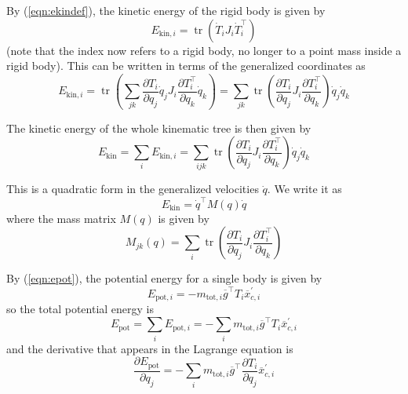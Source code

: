 \documentclass[a4paper]{article}
\begin{document}
By (\ref{eqn:ekindef}), the kinetic energy of the rigid body is given by
\begin{equation}
E_{\mathrm{kin},i} = \operatorname{tr} (\dot{T}_i J_i \dot{T}_i^\top)
\end{equation}
(note that the index now refers to a rigid body, no longer to a point mass inside a rigid body). This can be written in terms of the generalized coordinates as
\begin{equation}
E_{\mathrm{kin},i} = \operatorname{tr} (\sum_{jk} \frac{\partial T_i}{\partial q_j} \dot{q}_j J_i \frac{\partial T_i^\top}{\partial q_k} \dot{q}_k)
= \sum_{jk} \operatorname{tr} (\frac{\partial T_i}{\partial q_j} J_i \frac{\partial T_i^\top}{\partial q_k}) \dot{q}_j \dot{q}_k
\end{equation}

The kinetic energy of the whole kinematic tree is then given by
\begin{equation}
E_\mathrm{kin} = \sum_i E_{\mathrm{kin},i} = \sum_{ijk} \operatorname{tr} (\frac{\partial T_i}{\partial q_j} J_i \frac{\partial T_i^\top}{\partial q_k}) \dot{q}_j \dot{q}_k
\end{equation}

This is a quadratic form in the generalized velocities $\dot{q}$. We write it as
\begin{equation}
E_\mathrm{kin} = \dot{q}^\top M(q) \dot{q}
\end{equation}
where the mass matrix $M(q)$ is given by
\begin{equation}
M_{jk}(q) = \sum_i \operatorname{tr} (\frac{\partial T_i}{\partial q_j} J_i \frac{\partial T_i^\top}{\partial q_k})
\end{equation}

By (\ref{eqn:epot}), the potential energy for a single body is given by
\begin{equation}
E_{\mathrm{pot},i} = - m_{\mathrm{tot},i} \overline{g}^\top T_i \overline{x}_{c,i}^\prime
\end{equation}
so the total potential energy is
\begin{equation}
E_\mathrm{pot} = \sum_i E_{\mathrm{pot},i} = - \sum_i m_{\mathrm{tot},i} \overline{g}^\top T_i \overline{x}_{c,i}^\prime
\end{equation}
and the derivative that appears in the Lagrange equation is
\begin{equation}
\frac{\partial E_\mathrm{pot}}{\partial q_j} = - \sum_i m_{\mathrm{tot},i} \overline{g}^\top \frac{\partial T_i}{\partial q_j} \overline{x}_{c,i}^\prime
\end{equation}
\end{document}
